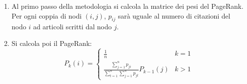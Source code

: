 \documentclass[a4paper, 12pt]{article}
\newcommand{\altroindice}{t}
\begin{document}
\begin{enumerate}
  \item 
  Al primo passo della metodologia si calcola la matrice dei pesi del PageRank. \\
  Per ogni coppia di nodi $ (i, j) $, $ p_{ij} $ sarà uguale al numero di citazioni del nodo $ i $ ad articoli scritti dal nodo $ j $. 
  \item
  Si calcola poi il PageRank: 
  \begin{equation}
  P_k(i) = 
    \begin{cases} 
      \displaystyle \frac{1}{n} & k = 1 \\
      \displaystyle \frac
        {\displaystyle \sum_{j=1}^{n} p_{ji}}
        {\displaystyle \sum_{\altroindice=1}^{n} {\sum_{j=1}^{n} p_{j\altroindice}}}
        P_{k-1}(j) & k > 1 


\end{cases}
\end{equation}
\end{enumerate}
\end{document}
